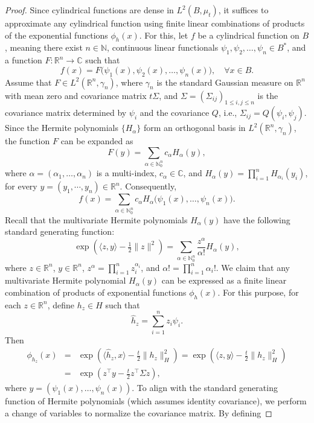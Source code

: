 \documentclass[11pt]{amsart}
\theoremstyle{definition}
\theoremstyle{remark}
\numberwithin{equation}{section}
\begin{document}
\begin{proof}
Since cylindrical functions are dense in \( L^2(B, \mu_t) \), it suffices to approximate any cylindrical function using finite linear combinations of products of the exponential functions \( \phi_h(x) \). For this, let \( f \) be a cylindrical function on \( B \), meaning there exist \( n \in \mathbb{N} \), continuous linear functionals \( \psi_1, \psi_2, \dots, \psi_n \in B^* \), and a function \( F: \mathbb{R}^n \to \mathbb{C} \) such that
\[
f(x) = F\big( \psi_1(x), \psi_2(x), \dots, \psi_n(x) \big), \quad \forall x \in B.
\]
Assume that \( F \in L^2(\mathbb{R}^n, \gamma_n) \), where \( \gamma_n \) is the standard Gaussian measure on \( \mathbb{R}^n \) with mean zero and covariance matrix \( t \Sigma \), and \( \Sigma=(\Sigma_{ij})_{1\leq i,j\leq n} \) is the covariance matrix determined by \( \psi_i \) and the covariance \( Q \), i.e., \(
\Sigma_{ij} = Q(\psi_i, \psi_j).
\) Since the Hermite polynomials \( \{ H_\alpha \} \) form an orthogonal basis in \( L^2(\mathbb{R}^n, \gamma_n) \), the function \( F \) can be expanded as
\[
F(y) = \sum_{\alpha \in \mathbb{N}_0^n} c_\alpha H_\alpha(y),
\]
where \( \alpha = (\alpha_1, \dots, \alpha_n) \) is a multi-index, \( c_\alpha \in \mathbb{C} \), and \( H_\alpha(y) = \prod_{i=1}^n H_{\alpha_i}(y_i) \), for every \(y=(y_1,\cdots, y_n)\in\mathbb{R}^n.\)   Consequently,
\[
f(x) = \sum_{\alpha \in \mathbb{N}_0^n} c_\alpha H_\alpha\big( \psi_1(x), \dots, \psi_n(x) \big).
\]
Recall that the multivariate Hermite polynomials \( H_\alpha(y) \) have the following standard generating function:
\[
\exp\left( \langle z, y \rangle - \tfrac{1}{2} \| z \|^2 \right) = \sum_{\alpha \in \mathbb{N}_0^n} \frac{z^\alpha}{\alpha!} H_\alpha(y),
\]
where \( z \in \mathbb{R}^n \), \( y \in \mathbb{R}^n \), \( z^\alpha = \prod_{i=1}^n z_i^{\alpha_i} \), and \( \alpha! = \prod_{i=1}^n \alpha_i! \).
We claim that any multivariate Hermite polynomial \( H_\alpha(y) \) can be expressed as a finite linear combination of products of exponential functions \( \phi_h(x) \). For this purpose, for each \( z \in \mathbb{R}^n \), define \( h_z \in H \) such that
\[
\hat{h}_z = \sum_{i=1}^n z_i \psi_i.
\]
Then
\begin{eqnarray*}
\phi_{h_z}(x) &=& \exp\left( \langle \hat{h}_z, x \rangle - \tfrac{t}{2} \| h_z \|_H^2 \right) = \exp\left( \langle z, y \rangle - \tfrac{t}{2} \| h_z \|_H^2 \right)
\\&=& \exp\left(  z^\top y - \tfrac{t}{2} z^\top \Sigma z \right),\end{eqnarray*} where \( y = (\psi_1(x), \dots, \psi_n(x)) \).  To align with the standard generating function of Hermite polynomials (which assumes identity covariance), we perform a change of variables to normalize the covariance matrix. By defining

\end{proof}
\end{document}

